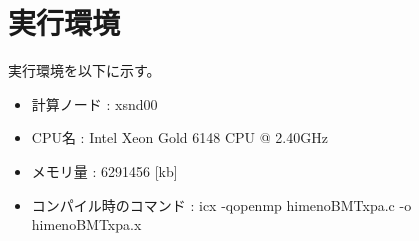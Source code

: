 \documentclass[]{jarticle}          %
\begin{document}
\section{実行環境}
実行環境を以下に示す。
\begin{itemize}
  \item 計算ノード : xsnd00
  \item CPU名 : Intel Xeon Gold 6148 CPU @ 2.40GHz
  \item メモリ量 : 6291456 [kb]
  \item コンパイル時のコマンド : icx -qopenmp himenoBMTxpa.c -o himenoBMTxpa.x
\end{itemize}
\end{document}
